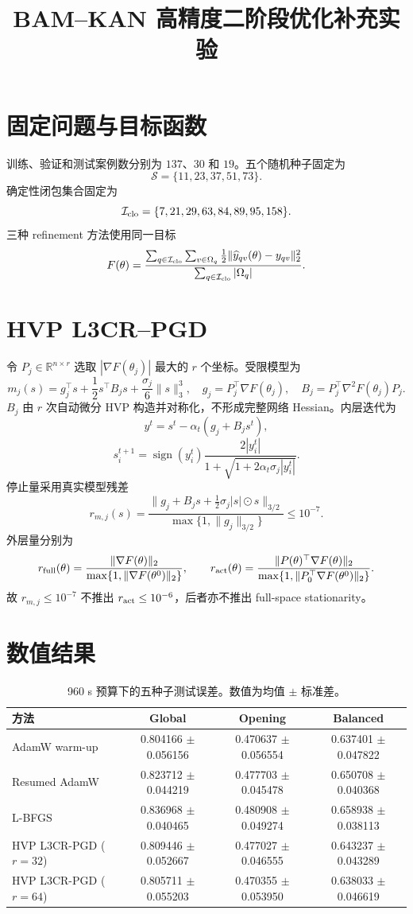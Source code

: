 \documentclass[UTF8,11pt,fontset=none]{ctexart}
\title{BAM--KAN 高精度二阶段优化补充实验}
\author{}
\date{}
\begin{document}
\maketitle

\section{固定问题与目标函数}
训练、验证和测试案例数分别为 $137$、$30$ 和 $19$。五个随机种子固定为
\[
\mathcal S=\{11,23,37,51,73\}.
\]
确定性闭包集合固定为
\[
\mathcal I_{\rm clo}=\{7,21,29,63,84,89,95,158\}.
\]
三种 refinement 方法使用同一目标
\[
F(\theta)=
\frac{\sum_{q\in\mathcal I_{\rm clo}}
\sum_{v\in\Omega_q}\frac12
\lVert \widehat y_{qv}(\theta)-y_{qv}\rVert_2^2}
{\sum_{q\in\mathcal I_{\rm clo}}|\Omega_q|}.
\]

\section{HVP L3CR--PGD}
令 $P_j\in\mathbb R^{n\times r}$ 选取 $|\nabla F(\theta_j)|$ 最大的 $r$ 个坐标。受限模型为
\[
m_j(s)=g_j^\top s+\frac12s^\top B_js+
\frac{\sigma_j}{6}\lVert s\rVert_3^3,
\quad
g_j=P_j^\top\nabla F(\theta_j),
\quad
B_j=P_j^\top\nabla^2F(\theta_j)P_j.
\]
$B_j$ 由 $r$ 次自动微分 HVP 构造并对称化，不形成完整网络 Hessian。内层迭代为
\[
y^t=s^t-\alpha_t(g_j+B_js^t),
\]
\[
s_i^{t+1}=\operatorname{sign}(y_i^t)
\frac{2|y_i^t|}
{1+\sqrt{1+2\alpha_t\sigma_j|y_i^t|}}.
\]
停止量采用真实模型残差
\[
r_{m,j}(s)=
\frac{\lVert g_j+B_js+\frac12\sigma_j|s|\odot s\rVert_{3/2}}
{\max\{1,\lVert g_j\rVert_{3/2}\}}
\le 10^{-7}.
\]
外层量分别为
\[
r_{\rm full}(\theta)=
\frac{\lVert\nabla F(\theta)\rVert_2}
{\max\{1,\lVert\nabla F(\theta^0)\rVert_2\}},
\qquad
r_{\rm act}(\theta)=
\frac{\lVert P(\theta)^\top\nabla F(\theta)\rVert_2}
{\max\{1,\lVert P_0^\top\nabla F(\theta^0)\rVert_2\}}.
\]
故 $r_{m,j}\le10^{-7}$ 不推出 $r_{\rm act}\le10^{-6}$，后者亦不推出 full-space stationarity。

\section{数值结果}
\begin{table}[H]
\centering
\caption{960 s 预算下的五种子测试误差。数值为均值 $\pm$ 标准差。}
\begin{tabular}{lccc}
\toprule
方法 & Global & Opening & Balanced\\
\midrule
AdamW warm-up & 0.804166 $\pm$ 0.056156 & 0.470637 $\pm$ 0.056554 & 0.637401 $\pm$ 0.047822 \\
Resumed AdamW & 0.823712 $\pm$ 0.044219 & 0.477703 $\pm$ 0.045478 & 0.650708 $\pm$ 0.040368 \\
L-BFGS & 0.836968 $\pm$ 0.040465 & 0.480908 $\pm$ 0.049274 & 0.658938 $\pm$ 0.038113 \\
HVP L3CR-PGD ($r=32$) & 0.809446 $\pm$ 0.052667 & 0.477027 $\pm$ 0.046555 & 0.643237 $\pm$ 0.043289 \\
HVP L3CR-PGD ($r=64$) & 0.805711 $\pm$ 0.055203 & 0.470355 $\pm$ 0.053950 & 0.638033 $\pm$ 0.046619 \\
\bottomrule
\end{tabular}
\end{table}
\end{document}
